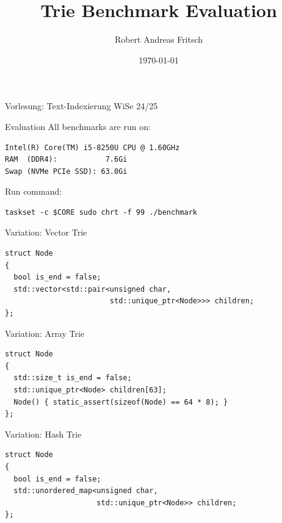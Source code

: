 \documentclass{beamer}
\title{Trie Benchmark Evaluation}
\author{Robert Andreas Fritsch}
\date{\today}
\begin{document}
    \begin{frame}
        \titlepage
        Vorlesung: Text-Indexierung WiSe 24/25\\
    \end{frame}

    \begin{frame}[fragile]{Evaluation}
        All benchmarks are run on:
        \begin{verbatim}
Intel(R) Core(TM) i5-8250U CPU @ 1.60GHz
RAM  (DDR4):           7.6Gi
Swap (NVMe PCIe SSD): 63.0Gi
        \end{verbatim}

        \vspace{0.5cm}
        Run command:
        \begin{verbatim}
taskset -c $CORE sudo chrt -f 99 ./benchmark
        \end{verbatim}
    \end{frame}


    \begin{frame}[fragile]{Variation: Vector Trie}
        \begin{lstlisting}[basicstyle=\ttfamily\small, frame=single]
struct Node
{
  bool is_end = false;
  std::vector<std::pair<unsigned char,
                        std::unique_ptr<Node>>> children;
};
        \end{lstlisting}
    \end{frame}

    \begin{frame}[fragile]{Variation: Array Trie}
        \begin{lstlisting}[basicstyle=\ttfamily\small, frame=single]
struct Node
{
  std::size_t is_end = false;
  std::unique_ptr<Node> children[63];
  Node() { static_assert(sizeof(Node) == 64 * 8); }
};
        \end{lstlisting}
    \end{frame}

    \begin{frame}[fragile]{Variation: Hash Trie}
        \begin{lstlisting}[basicstyle=\ttfamily\small, frame=single]
struct Node
{
  bool is_end = false;
  std::unordered_map<unsigned char,
                     std::unique_ptr<Node>> children;
};
        \end{lstlisting}
    \end{frame}
\end{document}

